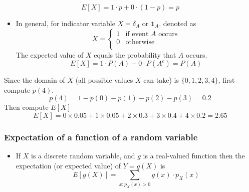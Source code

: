 \documentclass[slidestop,compress,mathserif]{beamer}
\begin{document}
\begin{frame}

\pause
\[ E[X] = 1 \cdot p + 0 \cdot (1-p) = p\]

\pause
\begin{itemize}
\item In general, for indicator variable $X = \delta_A$ or $\mathbf{1}_A$, denoted as
\[
X = \left\{
\begin{array}{ll}
1	& \text{if event } A \text{ occurs}\\
0	& \text{otherwise}\\
\end{array}
\right.
\]
\pause
The expected value of $X$ equals the probability that $A$ occurs.
\[ E[X] = 1 \cdot P(A) + 0 \cdot P(A^c) = P(A) \]
\end{itemize}


\end{frame}



\begin{frame}
\vspace{0.4cm}

\pause
Since the domain of $X$ (all possible values $X$ can take) is $\{0, 1, 2, 3, 4\}$,
first compute $p(4)$.
\[p(4) = 1 - p(0) - p(1) - p(2) - p(3) = 0.2\]
Then compute $E[X]$
\[ E[X] = 0 \times 0.05 + 1 \times 0.05 + 2 \times 0.3 + 3 \times 0.4 + 4 \times 0.2 = 2.65 \]


\end{frame}


\begin{frame}\frametitle{Expectation of a function of a random variable}
\begin{itemize}
\item If $X$ is a discrete random variable, and $g$ is a real-valued function then the expectation (or expected value) of $Y = g(X)$ is
\[ E[g(X)] = \sum_{x: p_X(x) > 0} g(x) \cdot p_X(x) \]
\end{itemize}


\end{frame}
\end{document}
